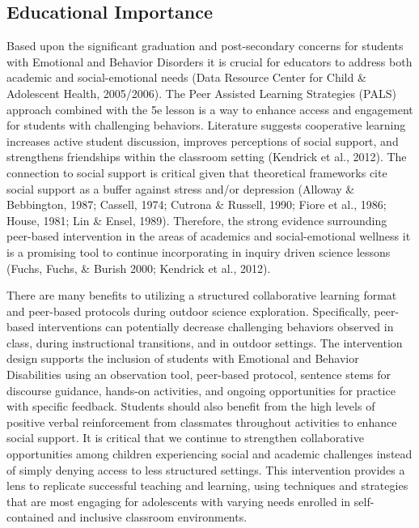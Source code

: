 \documentclass[11pt]{sig-alternate}
\begin{document}
\begin{large}
\section*{Educational Importance}
Based upon the significant graduation and post-secondary concerns for students with Emotional and Behavior Disorders it is crucial for educators to address both academic and social-emoti\-onal needs (Data Resource Center for Child \& Adolescent Health, 2005/2006). The Peer Assisted Learning Strategies (PALS) approach combined with the 5e lesson is a way to enhance access and engagement for students with challenging behaviors. Literature suggests cooperative learning increases active student discussion, improves perceptions of social support, and strengthens friendships within the classroom setting (Kendrick et al., 2012). The connection to social support is critical given that theoretical frameworks cite social support as a buffer against stress and/or depression (Alloway \& Bebbington, 1987; Cassell, 1974; Cutro\-na \& Russell, 1990; Fiore et al., 1986; House, 1981; Lin \& Ensel, 1989). Therefore, the strong evidence surrounding peer-based intervention in the areas of academics and social-emotional wellness it is a promising tool to continue incorporating in inquiry driven science lessons (Fuchs, Fuchs, \& Burish 2000; Kendrick et al., 2012). 
 
There are many benefits to utilizing a structured collaborative learning format and peer-based protocols during outdoor science exploration. Specifically, peer-based interventions can potentially decrease challenging behaviors observed in class, during instructional transitions, and in outdoor settings. The intervention design supports the inclusion of students with Emotional and Behavior Disabilities using an observation tool, peer-based protocol, sentence stems for discourse guidance, hands-on activities, and ongoing opportunities for practice with specific feedback. Students should also benefit from the high levels of positive verbal reinforcement from classmates throughout activities to enhance social support. It is critical that we continue to strengthen collaborative opportunities among children experiencing social and academic challenges instead of simply denying access to less structured settings. This intervention provides a lens to replicate successful teaching and learning, using techniques and strategies that are most engaging for adolescents with varying needs enrolled in self-contained and inclusive classroom environments.

 

\end{large}
\end{document}
